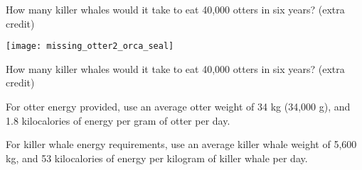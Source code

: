 \documentclass[t]{beamer}
\begin{document}
%
\begin{frame}[t]{How many killer whales would it take to eat 40,000 otters in six years? (extra credit)}

	\texttt{[image: missing\_otter2\_orca\_seal]}

\end{frame}
%
\begin{frame}[t]{How many killer whales would it take to eat 40,000 otters in six years? (extra credit)}

	\hangpara For otter energy provided, use \newline	
	\hspace*{1em} an average otter weight of 34 kg (34,000 g), and \newline
	\hspace*{1em} 1.8 kilocalories of energy per gram of otter per day.

	\hangpara For killer whale energy requirements, use \newline
	\hspace*{1em} an average killer whale weight of 5,600 kg, and \newline
	\hspace*{1em} 53 kilocalories of energy per kilogram of killer whale per day.

\end{frame}
%
\end{document}
